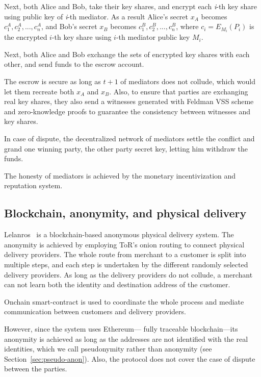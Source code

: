 \documentclass{ieeeaccess}
\begin{document}
Next, both Alice and Bob, take their key shares, and encrypt each
\textit{i}-th key share using public key of \textit{i}-th mediator. As a result
Alice's secret \(x_A\) becomes \({c^A_1, c^A_2,...,c^A_n}\), and Bob's
secret \(x_B\) becomes \({c^B_1, c^B_2,...,c^B_n}\), where
\(c_i = E_{M_i}(P_i)\) is the encrypted \(i\)-th key share using
\(i\)-th mediator public key \(M_i\).

Next, both Alice and Bob exchange the sets of encrypted key shares with
each other, and send funds to the escrow account.

The escrow is secure as long as \(t+1\) of mediators does not collude,
which would let them recreate both \(x_A\) and \(x_B\). Also, to ensure
that parties are exchanging real key shares, they also send a witnesses
generated with Feldman VSS scheme and zero-knowledge proofs to guarantee
the consistency between witnesses and key shares.

In case of dispute, the decentralized network of mediators settle the
conflict and grand one winning party, the other party secret key,
letting him withdraw the funds.

The honesty of mediators is achieved by the monetary incentivization and
reputation system.


\subsection{Blockchain, anonymity, and physical delivery}\label{lelantos-a-blockchain-based-anonymous-physical-delivery-system}

Lelanros~\cite{altawy2017lelantos} is a blockchain-based anonymous
physical delivery system. The anonymity is achieved by employing ToR's
onion routing to connect physical delivery providers. The whole route
from merchant to a customer is split into multiple steps, and each step is
undertaken by the different randomly selected delivery providers. As long as
the delivery providers do not collude, a merchant can not learn both
the identity and destination address of the customer.

Onchain smart-contract is used to coordinate the whole process and
mediate communication between customers and delivery providers.

However, since the system uses Ethereum— fully traceable blockchain—its anonymity is achieved as long as the addresses are not identified with the real identities, which we call pseudonymity rather than anonymity (see Section~\ref{sec:pseudo-anon}). Also, the protocol does not cover the case of dispute between the parties.
 
\end{document}
